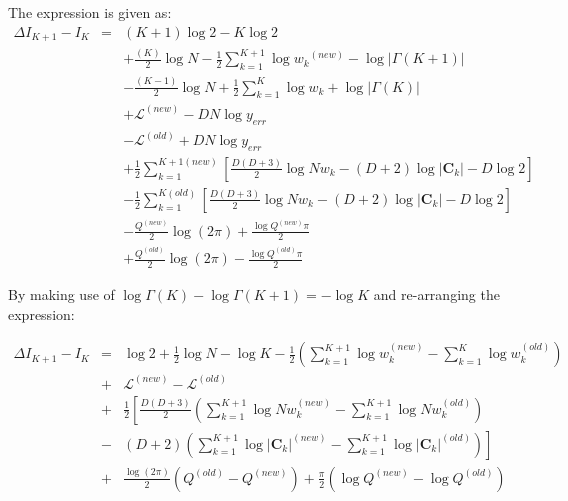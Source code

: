 \documentclass{elsarticle}
\newcommand{\vect}[1]{\boldsymbol{\mathbf{#1}}}
\def\cov{C}
\def\veccov{\vect{\cov}}
\begin{document}
The expression is given as:
\begin{eqnarray*}
\Delta{I_{K+1} - I_K} & = & (K + 1)\log{2} - K\log{2} \\ %
  &&+ \frac{(K)}{2}\log{N} - \frac{1}{2}\sum_{k=1}^{K+1}\log{w_k}^{(new)} - \log{|\Gamma(K+1)|} \\ %
  &&- \frac{(K - 1)}{2}\log{N} + \frac{1}{2}\sum_{k=1}^{K}\log{w_k} + \log{|\Gamma(K)|}\\ %
  &&+ \mathcal{L}^{(new)} - DN\log{y_{err}} \\ %
  &&- \mathcal{L}^{(old)} + DN\log{y_{err}} \\ %
  &&+ \frac{1}{2}\sum_{k=1}^{K+1(new)}\left[\frac{D(D+3)}{2}\log{{Nw_k}} - (D + 2)\log{|\veccov_k|} - D\log{2}\right] \\ %
  &&- \frac{1}{2}\sum_{k=1}^{K(old)}\left[\frac{D(D+3)}{2}\log{{Nw_k}} - (D + 2)\log{|\veccov_k|} - D\log{2}\right] \\ %
  &&- \frac{Q^{(new)}}{2}\log(2\pi) + \frac{\log{Q^{(new)}\pi}}{2} \\ %
  &&+ \frac{Q^{(old)}}{2}\log(2\pi) - \frac{\log{Q^{(old)}\pi}}{2} %
\end{eqnarray*}

\noindent{}By making use of $\log{\Gamma(K)} - \log{\Gamma(K + 1)} = -\log{K}$ and re-arranging the expression:

\begin{eqnarray}
\Delta{}I_{K+1} - I_K &=& \log{2} %
    + \frac{1}{2}\log{N} - \log{K} - \frac{1}{2}\left(\sum_{k=1}^{K+1}\log{w_k^{(new)}} - \sum_{k=1}^{K}\log{w_k^{(old)}}\right) \nonumber \\ %
& +& \mathcal{L}^{(new)} - \mathcal{L}^{(old)} \nonumber \\ %
& +& \frac{1}{2}\left[\frac{D(D+3)}{2}\left(\sum_{k=1}^{K+1}\log{Nw_k^{(new)} - \sum_{k=1}^{K+1}\log{Nw_k^{(old)}}} \right) \right.\nonumber\\
&-& \left.\left(D+2\right)\left(\sum_{k=1}^{K+1}\log{|\veccov_k|^{(new)}} - \sum_{k=1}^{K+1}\log{|\veccov_k|^{(old)}}\right)\right] \nonumber \\
& +& \frac{\log(2\pi)}{2}(Q^{(old)} - Q^{(new)}) + \frac{\pi}{2}\left(\log{Q^{(new)}} - \log{Q^{(old)}}\right)
\label{eq:13}
\end{eqnarray}
\end{document}
